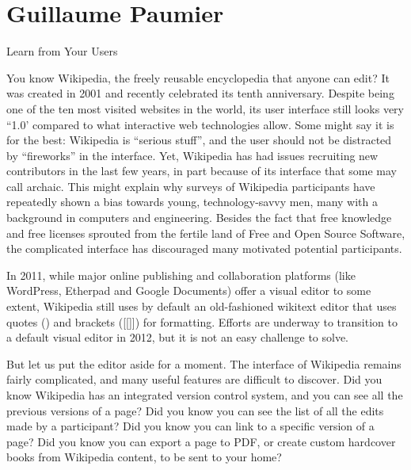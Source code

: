 
\chapter{Guillaume Paumier}{Learn from Your Users}

You know Wikipedia, the freely reusable encyclopedia that anyone can edit? It
was created in 2001 and recently celebrated its tenth anniversary. Despite being
one of the ten most visited websites in the world, its user interface still
looks very ``1.0' compared to what interactive web technologies allow. Some
might say it is for the best: Wikipedia is ``serious stuff'', and the user
should not be distracted by ``fireworks'' in the interface. Yet, Wikipedia has had
issues recruiting new contributors in the last few years, in part because of its
interface that some may call archaic. This might explain why surveys of
Wikipedia participants have repeatedly shown a bias towards young,
technology-savvy men, many with a background in computers and engineering.
Besides the fact that free knowledge and free licenses sprouted from the fertile
land of Free and Open Source Software, the complicated interface has discouraged
many motivated potential participants.

In 2011, while major online publishing and collaboration platforms (like
WordPress, Etherpad and Google Documents) offer a visual editor to some extent,
Wikipedia still uses by default an old-fashioned wikitext editor that uses
quotes (\textquotesingle \textquotesingle \textquotesingle \textquotesingle) and
brackets ([[]]) for formatting. Efforts are underway to transition to a default
visual editor in 2012, but it is not an easy challenge to solve.

But let us put the editor aside for a moment. The interface of Wikipedia remains
fairly complicated, and many useful features are difficult to discover. Did you
know Wikipedia has an integrated version control system, and you can see all
the previous versions of a page? Did you know you can see the list of all the
edits made by a participant? Did you know you can link to a specific version
of a page? Did you know you can export a page to PDF, or create custom
hardcover books from Wikipedia content, to be sent to your home?

